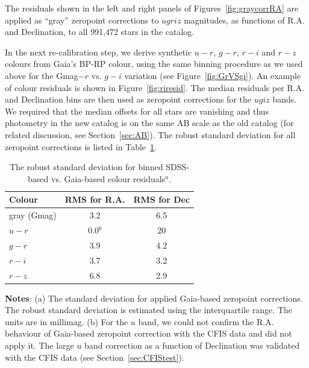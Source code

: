 \documentclass[fleqn,usenatbib]{mnras}
\begin{document}
The residuals shown in the left and right panels of Figures~\ref{fig:graycorrRA} are
applied as ``gray'' zeropoint corrections to $ugriz$ magnitudes, as functions of 
R.A. and Declination, to all 991,472 stars in the catalog. 

In the next re-calibration step, we derive synthetic $u-r$, $g-r$, $r-i$ and $r-z$ colours
from Gaia's BP-RP colour, using the same binning procedure as we used above for 
the Gmag$-r$ vs. $g-i$ variation (see Figure~\ref{fig:GrVSgi}). An example of colour residuals 
is shown in Figure~\ref{fig:riresid}.  The median residuals per R.A. and Declination bins 
are then used as zeropoint corrections for the $ugiz$ bands. We required that the median
offsets for all stars are vanishing and thus photometry in the new catalog is on the 
same AB scale as the old catalog (for related discussion, see Section~\ref{sec:AB}). 
The robust standard deviation for all zeropoint corrections is listed in Table~\ref{tab:GaiaRMS}. 

\begin{table}
	\centering
	\caption{The robust standard deviation for binned SDSS-based vs. Gaia-based colour residuals$^a$. }
	\label{tab:GaiaRMS}

	\begin{tabular}{l|c|c} %
		\hline
		Colour & RMS for R.A. & RMS for Dec \\
		\hline
 
 gray (Gmag) &    3.2         &    6.5   \\
    $u-r$        &   0.0$^b$  &   20    \\     
    $g-r$        &   3.9         &    4.2    \\
    $r-i$         &   3.7         &    3.2    \\ 
    $r-z$        &   6.8         &    2.9    \\ 
		\hline
	\end{tabular}
     \vspace{1ex}

     {\raggedright {\bf Notes}: (a) The standard deviation for applied Gaia-based zeropoint corrections. The robust standard deviation is estimated using the interquartile range. The units are in millimag. \newline (b) For the $u$ band, we could not confirm the R.A. behaviour of Gaia-based zeropoint correction with the CFIS data and did not apply it. The large $u$ band correction as a function of Declination was validated with the CFIS data (see Section~\ref{sec:CFIStest}). \par}
\end{table}
\end{document}
